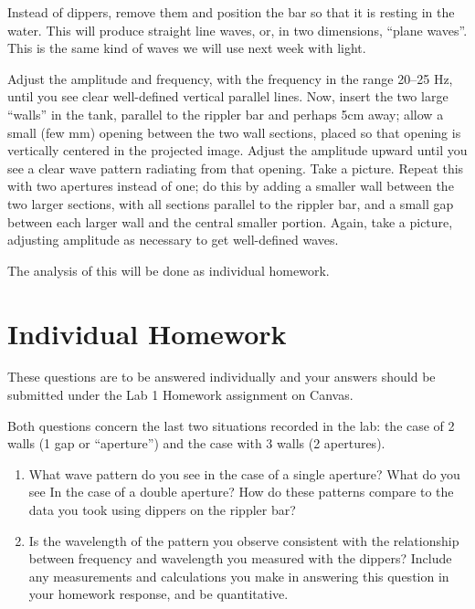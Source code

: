 Instead of dippers, remove them and position the bar so that it is resting in the water. This will produce straight line waves, or, in two dimensions, ``plane waves''. This is the same kind of waves we will use next week with light.

Adjust the amplitude and frequency, with the frequency in the range 20--25 Hz, until you see
clear well-defined vertical parallel lines. Now, insert the two large ``walls'' in the tank, parallel to the rippler bar and
perhaps 5cm away; allow a small (few mm) opening between the two wall sections, placed so that opening is vertically
centered in the projected image. Adjust the amplitude upward until you see a clear wave pattern radiating from that
opening. Take a picture. Repeat this with two apertures instead of one; do this by adding a smaller wall between the
two larger sections, with all sections parallel to the rippler bar, and a small gap between each larger wall and the central
smaller portion. Again, take a picture, adjusting amplitude as necessary to get well-defined waves.

The analysis of this will be done as individual homework.

\section{Individual Homework}

These questions are to be answered individually and your answers should be submitted under the Lab 1 Homework assignment on Canvas.

Both questions concern the last two situations recorded in the lab: the case of 2 walls (1 gap or ``aperture'') and the case with 3 walls (2 apertures).

\begin{enumerate}
	\item What wave pattern do you see in the case of a single aperture? What do you see In the case of a double aperture?
	How do these patterns compare to the data you took using dippers on the rippler bar?
	
	\item Is the wavelength of the pattern you observe consistent with the relationship between frequency and wavelength you
	measured with the dippers? Include any measurements and calculations you make in answering this question in your homework response, and be quantitative.
\end{enumerate}